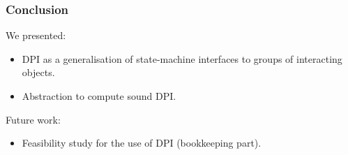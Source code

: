 \documentclass{beamer}
\begin{document}
\begin{frame}
  \frametitle{Conclusion}

  We presented:
  \begin{itemize}
  \item DPI as a generalisation of state-machine interfaces to groups of interacting objects.
  \item Abstraction to compute sound DPI.
  \end{itemize}

  \vspace{3ex}

  Future work:
  \begin{itemize}
  \item Feasibility study for the use of DPI (bookkeeping part).
  \end{itemize}

\end{frame}
\end{document}

